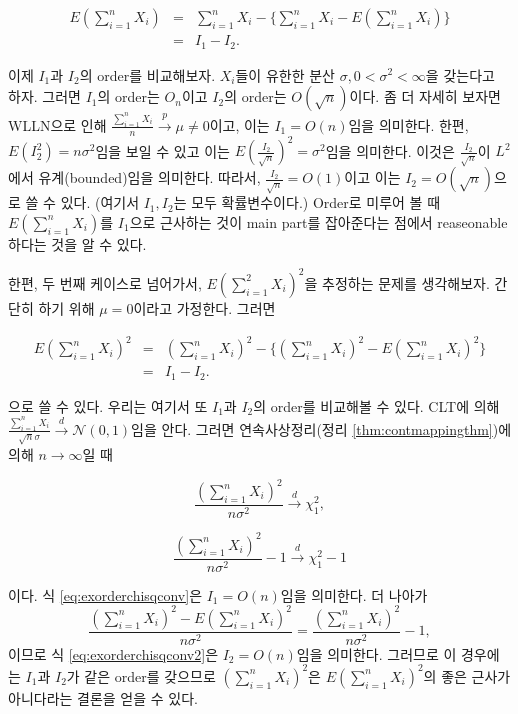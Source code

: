 \documentclass[b5paper,]{scrbook}
\theoremstyle{plain}
\theoremstyle{definition}
\numberwithin{equation}{section}
\begin{document}
\begin{eqnarray}
E(\sum_{i=1}^{n}X_{i})&=&\sum_{i=1}^{n}X_{i}-\{ \sum_{i=1}^{n}X_{i}-E(\sum_{i=1}^{n}X_{i})\}\\
&=&I_{1}-I_{2}.
\end{eqnarray}

이제 \(I_{1}\)과 \(I_{2}\)의 order를 비교해보자. \(X_{i}\)들이 유한한
분산 \(\sigma, 0<\sigma^{2}<\infty\)을 갖는다고 하자. 그러면 \(I_{1}\)의
order는 \(O_{n}\)이고 \(I_{2}\)의 order는 \(O(\sqrt{n})\)이다. 좀 더
자세히 보자면 WLLN으로 인해
\(\frac{\sum_{i=1}^{n}X_{i}}{n}\stackrel{p}{\rightarrow}\mu\neq 0\)이고,
이는 \(I_{1}=O(n)\)임을 의미한다. 한편, \(E(I_{2}^{2})=n\sigma^{2}\)임을
보일 수 있고 이는 \(E(\frac{I_{2}}{\sqrt{n}})^{2}=\sigma^{2}\)임을
의미한다. 이것은 \(\frac{I_{2}}{\sqrt{n}}\)이 \(L^{2}\)에서
유계(bounded)임을 의미한다. 따라서, \(\frac{I_{2}}{\sqrt{n}}=O(1)\)이고
이는 \(I_{2}=O(\sqrt{n})\)으로 쓸 수 있다. (여기서 \(I_{1}, I_{2}\)는
모두 확률변수이다.) Order로 미루어 볼 때 \(E(\sum_{i=1}^{n}X_{i})\)를
\(I_{1}\)으로 근사하는 것이 main part를 잡아준다는 점에서
reaseonable하다는 것을 알 수 있다.

한편, 두 번째 케이스로 넘어가서, \(E(\sum_{i=1}^{2}X_{i})^{2}\)을
추정하는 문제를 생각해보자. 간단히 하기 위해 \(\mu=0\)이라고 가정한다.
그러면

\begin{eqnarray}
E(\sum_{i=1}^{n}X_{i})^{2}&=&(\sum_{i=1}^{n}X_{i})^{2}-\{ (\sum_{i=1}^{n}X_{i})^{2}-E(\sum_{i=1}^{n}X_{i})^{2}\}\\
&=&I_{1}-I_{2}.
\end{eqnarray}

으로 쓸 수 있다. 우리는 여기서 또 \(I_{1}\)과 \(I_{2}\)의 order를
비교해볼 수 있다. CLT에 의해
\(\frac{\sum_{i=1}^{n}X_{i}}{\sqrt{n}\sigma}\stackrel{d}{\rightarrow}\mathcal{N}(0,1)\)임을
안다. 그러면 연속사상정리(정리 \ref{thm:contmappingthm})에 의해
\(n\rightarrow\infty\)일 때

\begin{equation}
\frac{(\sum_{i=1}^{n}X_{i})^{2}}{n\sigma^{2}}\stackrel{d}{\rightarrow}\chi_{1}^{2},
\label{eq:exorderchisqconv}
\end{equation}

\begin{equation}
\frac{(\sum_{i=1}^{n}X_{i})^{2}}{n\sigma^{2}}-1 \stackrel{d}{\rightarrow}\chi_{1}^{2}-1
\label{eq:exorderchisqconv2}
\end{equation}

이다. 식 \eqref{eq:exorderchisqconv}은 \(I_{1}=O(n)\)임을 의미한다. 더
나아가
\[\frac{(\sum_{i=1}^{n}X_{i})^{2}-E(\sum_{i=1}^{n}X_{i})^{2}}{n\sigma^{2}}=\frac{(\sum_{i=1}^{n}X_{i})^{2}}{n\sigma^{2}}-1,\]
이므로 식 \eqref{eq:exorderchisqconv2}은 \(I_{2}=O(n)\)임을 의미한다.
그러므로 이 경우에는 \(I_{1}\)과 \(I_{2}\)가 같은 order를 갖으므로
\((\sum_{i=1}^{n}X_{i})^{2}\)은 \(E(\sum_{i=1}^{n}X_{i})^{2}\)의 좋은
근사가 아니다라는 결론을 얻을 수 있다.
\end{document}

